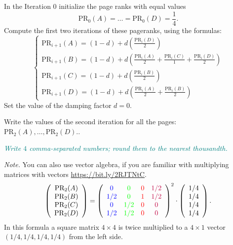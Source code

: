 \documentclass[jou]{apa6}
\begin{document}

In the Iteration $0$ initialize the page ranks with equal values 
$$\text{PR}_0(A) = \ldots = \text{PR}_0(D) = \frac{1}{4}.$$ 
Compute the first two iterations of these pageranks, using the formulas: 
$$\left\{ \begin{array}{l}
\text{PR}_{i+1}(A) = (1 - d) + d\left( \frac{\text{PR}_i(D)}{2} \right)\\
\text{PR}_{i+1}(B) = (1 - d) + d\left( \frac{\text{PR}_i(A)}{2} + \frac{\text{PR}_i(C)}{1} + \frac{\text{PR}_i(D)}{2}  \right)\\
\text{PR}_{i+1}(C) = (1 - d) + d\left( \frac{\text{PR}_i(B)}{2} \right)\\
\text{PR}_{i+1}(D) = (1 - d) + d\left( \frac{\text{PR}_i(A)}{2} + \frac{\text{PR}_i(B)}{2} \right)
\end{array} \right.$$
Set the value of the damping factor $d=0$.

Write the values of the second iteration for all the pages:
$\text{PR}_2(A),\ldots,\text{PR}_2(D).$.

\textcolor{teal}{\em Write $4$ comma-separated numbers; round them to 
the nearest thousandth.}





\vspace{4pt}
{\em Note.} You can also use vector algebra, if you are 
familiar with multiplying matrices with vectors
\textendash{} \url{https://bit.ly/2RJTNtC}.
$$\left( \begin{array}{c}
\text{PR}_2(A)\\
\text{PR}_2(B)\\
\text{PR}_2(C)\\
\text{PR}_2(D)
\end{array} \right) = \left( 
\begin{array}{cccc}
\textcolor{blue}{0}   & \textcolor{green}{0}   & \textcolor{red}{0} & \textcolor{purple}{1/2} \\
\textcolor{blue}{1/2} & \textcolor{green}{0}   & \textcolor{red}{1} & \textcolor{purple}{1/2} \\
\textcolor{blue}{0}   & \textcolor{green}{1/2} & \textcolor{red}{0} & \textcolor{purple}{0} \\
\textcolor{blue}{1/2} & \textcolor{green}{1/2} & \textcolor{red}{0} & \textcolor{purple}{0}
\end{array} \right)^2 \cdot \left( \begin{array}{c}
1/4 \\
1/4 \\
1/4 \\
1/4
\end{array} \right).$$
In this formula a square matrix $4 \times 4$ is twice multiplied to a $4 \times 1$
vector $(1/4, 1/4, 1/4, 1/4)$ from the left side. 
\end{document}
